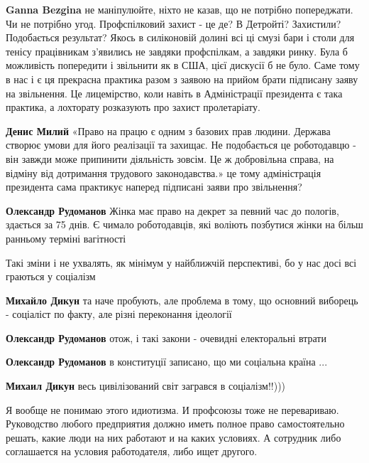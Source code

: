 \begin{itemize}
\begin{itemize}
\textbf{Ganna Bezgina} не маніпулюйте, ніхто не казав, що не потрібно попереджати. Чи не потрібно угод.
Профспілковий захист - це де? В Детройті? Захистили? Подобається результат? Якось в силіконовій долині всі ці смузі бари і столи для тенісу працівникам з’явились не завдяки профспілкам, а завдяки ринку.
Була б можливість попередити і звільнити як в США, цієї дискусії б не було. Саме тому в нас і є ця прекрасна практика разом з заявою на прийом брати підписану заяву на звільнення. Це лицемірство, коли навіть в Адміністрації президента є така практика, а лохторату розказують про захист пролетаріату.

\textbf{Денис Милий} «Право на працю є одним з базових прав людини. Держава створює умови для його реалізації та захищає. Не подобається це роботодавцю - він завжди може припинити діяльність зовсім. Це ж добровільна справа, на відміну від дотримання трудового законодавства.» це тому адміністрація президента сама практикує наперед підписані заяви про звільнення?

\textbf{Олександр Рудоманов} Жінка має право на декрет за певний час до пологів, здається за 75 днів. Є чимало роботодавців, які воліють позбутися жінки на більш ранньому терміні вагітності

\end{itemize} %

Такі зміни і не ухвалять, як мінімум у найближчій перспективі, бо у нас досі всі граються у соціалізм

\begin{itemize} %
\textbf{Михайло Дикун} та наче пробують, але проблема в тому, що основний виборець - соціаліст по факту, але різні переконання ідеології

\textbf{Олександр Рудоманов} отож, і такі закони - очевидні електоральні втрати

\textbf{Олександр Рудоманов} в конституції записано, що ми соціальна країна ...

\textbf{Михаил Дикун} весь цивілізований світ загрався в соціалізм!!)))
\end{itemize} %


Я вообще не понимаю этого идиотизма. И профсоюзы тоже не перевариваю.
Руководство любого предприятия должно иметь полное право самостоятельно решать,
какие люди на них работают и на каких условиях. А сотрудник либо соглашается на
условия работодателя, либо ищет другого.


\end{itemize}
